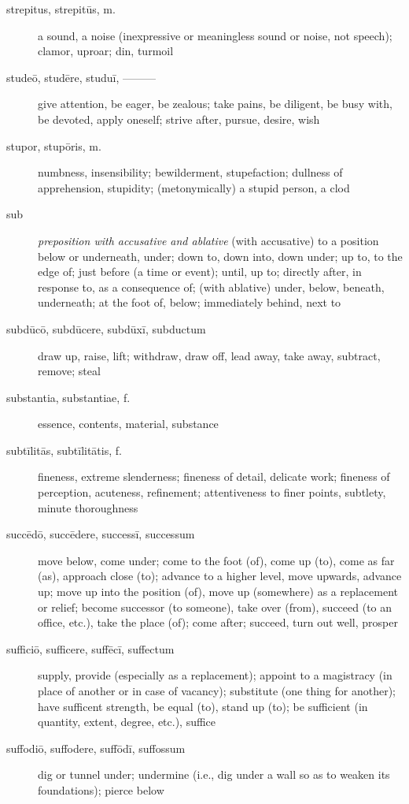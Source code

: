 \begin{description}
    \item[strepitus, strepitūs, m.] a sound, a noise (inexpressive or meaningless sound or noise, not speech); clamor, uproar; din, turmoil
    \item[studeō, studēre, studuī, ———] \marginnote{*}give attention, be eager, be zealous; take pains, be  diligent, be busy with, be devoted, apply oneself; strive after, pursue, desire, wish
    \item[stupor, stupōris, m.] numbness, insensibility; bewilderment, stupefaction; dullness of apprehension, stupidity; (metonymically) a stupid person, a clod
    \item[sub] \marginnote{*}\textit{preposition with accusative and ablative} (with accusative) to a position below or underneath, under; down to, down into, down under; up to, to the edge of; just before (a time or event); until, up to; directly after, in response to, as a consequence of; (with ablative) under, below, beneath, underneath; at the foot of, below; immediately behind, next to
    \item[subdūcō, subdūcere, subdūxī, subductum] draw up, raise, lift; withdraw, draw off, lead away, take away, subtract, remove; steal
    \item[substantia, substantiae, f.] essence, contents, material, substance
    \item[subtīlitās, subtīlitātis, f.] fineness, extreme slenderness; fineness of detail, delicate work; fineness of perception, acuteness, refinement; attentiveness to finer points, subtlety, minute thoroughness
    \item[succēdō, succēdere, successī, successum] move below, come under; come to the foot (of), come up (to), come as far (as), approach close (to); advance to a higher level, move upwards, advance up; move up into the position (of), move up (somewhere) as a replacement or relief; become successor (to someone), take over (from), succeed (to an office, etc.), take the place (of); come after; succeed, turn out well, prosper
    \item[sufficiō, sufficere, suffēcī, suffectum] supply, provide (especially as a replacement); appoint to a magistracy (in place of another or in case of vacancy); substitute (one thing for another); have sufficent strength, be equal (to), stand up (to); be sufficient (in quantity, extent, degree, etc.), suffice
    \item[suffodiō, suffodere, suffōdī, suffossum] dig or tunnel under; undermine (i.e., dig under a wall so as to weaken its foundations); pierce below

\end{description}
